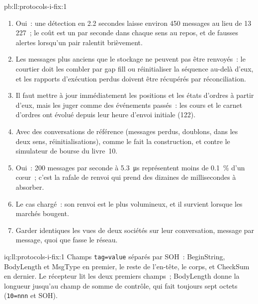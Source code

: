 \begin{solution}{pb:ll:protocols-i-fix:1}
\begin{enumerate}
\qty{25}{\milli\second} pour se resynchroniser avec le moteur C++ et \qty{94}{\milli\second} avec la référence Python, avec ou
sans ~; un week-end calme de 48 heures laisse 5\,776 messages, que le  ramène à 77, de \qty{42}{\milli\second} à
\qty{2.5}{\milli\second}.
\item Oui~: une détection en 2.2 secondes laisse environ 450 messages au lieu de 13\,227~; le coût est un  par seconde dans chaque sens
au repos, et de fausses alertes lorsqu'un pair ralentit brièvement.
\item Les messages plus anciens que le stockage ne peuvent pas être renvoyés~: le courtier doit les combler par gap fill ou réinitialiser la séquence au-delà d'eux, et les rapports d'exécution
perdus doivent être récupérés par réconciliation.
\item Il faut mettre à jour immédiatement les positions et les états d'ordres à partir d'eux, mais les juger comme des événements passés~: les cours et le carnet d'ordres ont
évolué depuis leur heure d'envoi initiale (122).
\item Avec des conversations de référence (messages perdus, doublons,  dans les deux sens, réinitialisations), comme le fait la construction,
et contre le simulateur de bourse du livre~10.
\item Oui~: 200 messages par seconde à \qty{5.3}{\micro\second} représentent moins de 0.1~\% d'un cœur~; c'est la rafale de renvoi qui
prend des dizaines de millisecondes à absorber.
\item Le cas chargé~: son renvoi est le plus volumineux, et il survient lorsque les marchés bougent.
\item Garder identiques les vues de deux sociétés sur leur conversation, message par message, quoi que fasse le réseau.
\end{enumerate}
\end{solution}

\begin{solution}{iq:ll:protocols-i-fix:1}
Champs \texttt{tag=value} séparés par SOH~: BeginString, BodyLength et MsgType en premier, le reste de l'en-tête, le corps, et
CheckSum en dernier. Le récepteur lit les deux premiers champs~; BodyLength donne la longueur jusqu'au champ de somme de contrôle, qui fait toujours
sept octets (\texttt{10=nnn} et SOH).
\end{solution}

